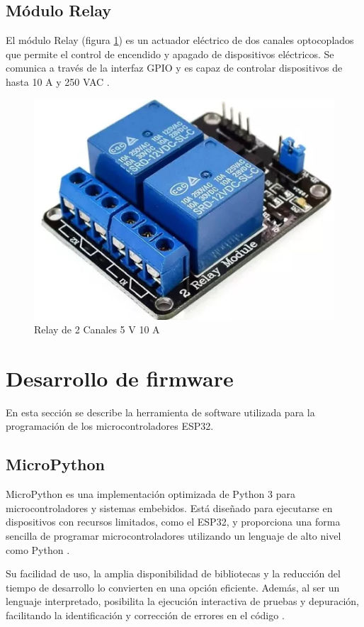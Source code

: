 \subsection{Módulo Relay}

El módulo Relay (figura \ref{fig:Relay}) es un actuador eléctrico de dos
canales optocoplados que permite el control de encendido y apagado de
dispositivos eléctricos. Se comunica a través de la interfaz GPIO y es capaz de
controlar dispositivos de hasta 10 A y 250 VAC \cite{Relay}.

\begin{figure}[H]
	\centering
	\includegraphics[height=.15\textwidth]{./Images/13.png}
	\caption{Relay de 2 Canales 5 V 10 A}
	\label{fig:Relay}
\end{figure}


\section{Desarrollo de firmware}

En esta sección se describe la herramienta de software utilizada para la
programación de los microcontroladores ESP32.

\subsection{MicroPython}

MicroPython es una implementación optimizada de Python 3 para
microcontroladores y sistemas embebidos. Está diseñado para ejecutarse en
dispositivos con recursos limitados, como el ESP32, y proporciona una forma
sencilla de programar microcontroladores utilizando un lenguaje de alto nivel
como Python \cite{MicroPython}.

Su facilidad de uso, la amplia disponibilidad de bibliotecas y la reducción del
tiempo de desarrollo lo convierten en una opción eficiente. Además, al ser un
lenguaje interpretado, posibilita la ejecución interactiva de pruebas y
depuración, facilitando la identificación y corrección de errores en el código
\cite{CTAMicroPython}.

